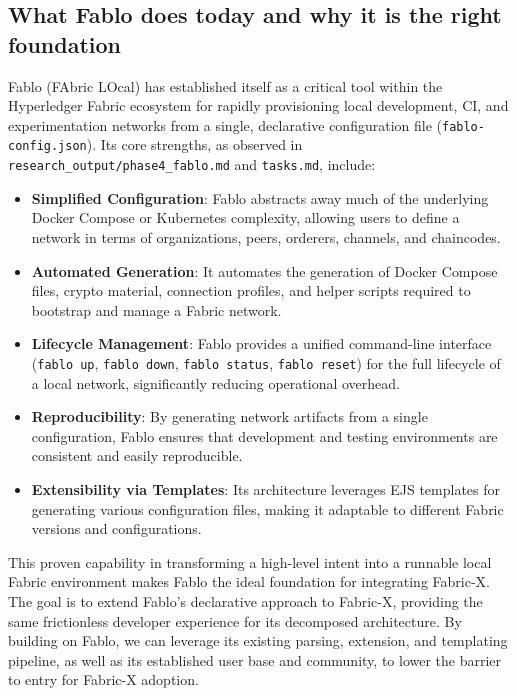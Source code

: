 \subsection{What Fablo does today and why it is the right foundation}

Fablo (FAbric LOcal) has established itself as a critical tool within the Hyperledger Fabric ecosystem for rapidly provisioning local development, CI, and experimentation networks from a single, declarative configuration file (\texttt{fablo-config.json}). Its core strengths, as observed in \texttt{research\_output/phase4\_fablo.md} and \texttt{tasks.md}, include:
\begin{itemize}[leftmargin=*]
    \item \textbf{Simplified Configuration}: Fablo abstracts away much of the underlying Docker Compose or Kubernetes complexity, allowing users to define a network in terms of organizations, peers, orderers, channels, and chaincodes.
    \item \textbf{Automated Generation}: It automates the generation of Docker Compose files, crypto material, connection profiles, and helper scripts required to bootstrap and manage a Fabric network.
    \item \textbf{Lifecycle Management}: Fablo provides a unified command-line interface (\texttt{fablo up}, \texttt{fablo down}, \texttt{fablo status}, \texttt{fablo reset}) for the full lifecycle of a local network, significantly reducing operational overhead.
    \item \textbf{Reproducibility}: By generating network artifacts from a single configuration, Fablo ensures that development and testing environments are consistent and easily reproducible.
    \item \textbf{Extensibility via Templates}: Its architecture leverages EJS templates for generating various configuration files, making it adaptable to different Fabric versions and configurations.
\end{itemize}
This proven capability in transforming a high-level intent into a runnable local Fabric environment makes Fablo the ideal foundation for integrating Fabric-X. The goal is to extend Fablo's declarative approach to Fabric-X, providing the same frictionless developer experience for its decomposed architecture. By building on Fablo, we can leverage its existing parsing, extension, and templating pipeline, as well as its established user base and community, to lower the barrier to entry for Fabric-X adoption.

